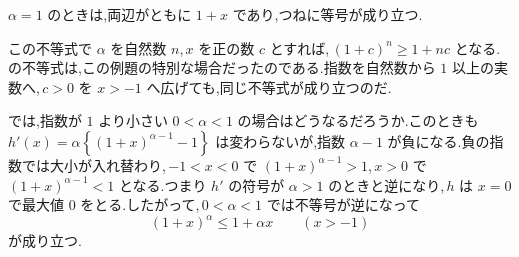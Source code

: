 $\alpha=1$ のときは,両辺がともに $1+x$ であり,つねに等号が成り立つ.

\medskip
この不等式で $\alpha$ を自然数 $n$,\,$x$ を正の数 $c$ とすれば,\,$(1+c)^n\ge1+nc$ となる.\,の不等式は,この例題の特別な場合だったのである.指数を自然数から $1$ 以上の実数へ,\,$c>0$ を $x>-1$ へ広げても,同じ不等式が成り立つのだ.

では,指数が $1$ より小さい $0<\alpha<1$ の場合はどうなるだろうか.このときも $h'(x)=\alpha\left\{(1+x)^{\alpha-1}-1\right\}$ は変わらないが,指数 $\alpha-1$ が負になる.負の指数では大小が入れ替わり,\,$-1<x<0$ で $(1+x)^{\alpha-1}>1$,\,$x>0$ で $(1+x)^{\alpha-1}<1$ となる.つまり $h'$ の符号が $\alpha>1$ のときと逆になり,\,$h$ は $x=0$ で最大値 $0$ をとる.したがって,\,$0<\alpha<1$ では不等号が逆になって
\[
 (1+x)^\alpha\le1+\alpha x\qquad(x>-1)
\]
が成り立つ.
